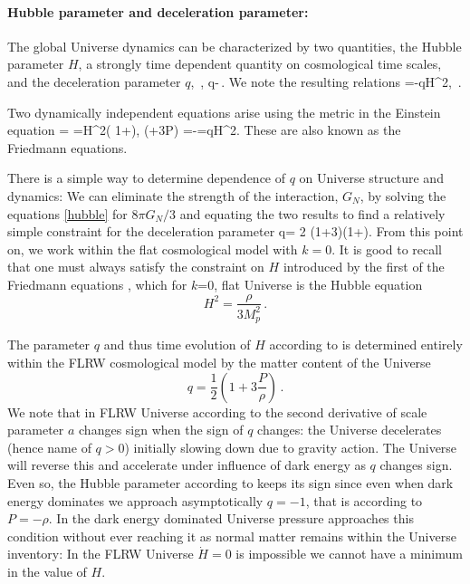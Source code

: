 \paragraph{Hubble parameter and deceleration parameter:}
The global Universe dynamics can be characterized by two quantities, the Hubble parameter $H$, a strongly time dependent quantity on cosmological time scales, and the deceleration parameter $q$,
\beqn\label{dynamic}
\,, 
\eeqn
\beqn\label{dynamic1}
q\equiv -\,.
\eeqn
We note the resulting relations
\beqn\label{eq:Hdot1}
 =-qH^2,
 \eeqn
\beqn\label{eq:Hdot}
 \,. 
\eeqn

Two dynamically independent equations arise using the metric  in the Einstein equation 
\beqn\label{hubble}
 \rho = 
=H^2\left( 1+\right),
\qquad
{} (\rho+3P) =-=qH^2.
\eeqn
These are also known as the Friedmann equations. 

There is a simple way to determine dependence of $q$ on Universe structure and dynamics: We can eliminate the strength of the interaction, $G_N$, by solving the equations \eqref{hubble} for ${8\pi G_N}/{3}$ and equating the two results to find a relatively simple constraint for the deceleration parameter
\beqn\label{qparam0}
q= 2 \left(1+3\right)\left(1+\right).
\eeqn
From this point on, we work within the flat cosmological model with $k=0$. It is good to recall that one must always satisfy the constraint on $H$ introduced by the first of the Friedmann equations , which for $k$=0, flat Universe is the Hubble equation
\begin{equation}\label{Hubble_eq}
H^2=\frac{\rho}{3M_p^2}\,.
\end{equation}

The parameter $q$ and thus time evolution of $H$ according to  is determined entirely within the FLRW cosmological model by the matter content of the Universe
\begin{equation}\label{qparam}
\boxed{q=\frac 1 2 \left(1+3\frac{P}{\rho}\right)}\,.
\end{equation}
We note that in FLRW  Universe  according to  the second derivative of scale parameter $a$ changes sign when the sign of $q$ changes: the  Universe decelerates (hence name of $q>0$) initially slowing down due to gravity action. The Universe will reverse this and accelerate under influence of dark energy as $q$ changes sign. Even so, the Hubble parameter according to   keeps its sign since even when dark energy dominates we approach asymptotically $q=-1$, that is  according to   $P=-\rho$. In the dark energy dominated Universe pressure approaches this condition without ever reaching it as normal matter remains within the Universe inventory: In the FLRW Universe $\dot H=0$ is impossible we cannot have a minimum in the value of $H$. 

